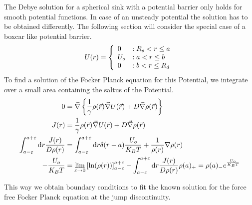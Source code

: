 The Debye solution for a spherical sink with a potential barrier only holds for smooth potential functions. In case of an unsteady potential the solution has to be obtained differently. The following section will consider the special case of a boxcar like potential barrier.
\begin{equation}
    U(r) = \left\{ \begin{array}{l l} 
        0 &: R_s < r \le a \\
        U_o &: a<r \le b \\
        0 &: b < r \le R_d
    \end{array} \right.
    \label{Boxcar_Potential}
\end{equation}
To find a solution of the Focker Planck equation for this Potential, we integrate over a small area containing the saltus of the Potential. 
\begin{align}
    0 &= \vec{\nabla} \left\{ \frac{1}{\gamma} \rho(\vec{r}) \vec{\nabla} U(\vec{r}) + D \vec{\nabla} \rho(\vec{r}) \right\} \\
    J(r) &=  \frac{1}{\gamma} \rho(\vec{r}) \vec{\nabla} U(\vec{r}) + D \vec{\nabla} \rho(\vec{r}) \\
    \int_{a - \varepsilon}^{a + \varepsilon} {\rm d} r \frac{J(r)}{D\rho(r)} &= \int_{a - \varepsilon}^{a + \varepsilon} {\rm d} r \delta(r - a) \frac{U_o}{K_B T} + \frac{1}{\rho(r)} \nabla \rho(r) \\
    -\frac{U_o}{K_B T} &= \lim_{\varepsilon \rightarrow 0} \left[ \ln (\rho(r) ) \right]_{a - \varepsilon}^{a + \varepsilon} - \int_{a - \varepsilon}^{a + \varepsilon} {\rm d} r \frac{J(r)}{D\rho(r)}
    \rho(a)_{+} = \rho(a)_{-} e^{\frac{U_o}{K_B T}}
    \label{Boxcar_BC}
\end{align}

This way we obtain boundary conditions to fit the known solution for the force free Focker Planck equation at the jump discontinuity.
